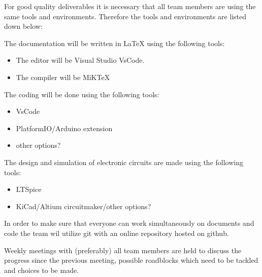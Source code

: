 For good quality deliverables it is necessary that all team members are using the same tools and environments. Therefore the tools and environments are listed down below:

The documentation will be written in LaTeX using the following tools:
\begin{itemize} 
    \setlength\itemsep{-0.3em}
    \item The editor will be Visual Studio VsCode.
    \item The compiler will be MiKTeX
\end{itemize}

The coding will be done using the following tools:
\begin{itemize}
    \item VsCode
    \item PlatformIO/Arduino extension
    \item other options?
\end{itemize}

The design and simulation of electronic circuits are made using the following tools:
\begin{itemize}
    \item LTSpice
    \item KiCad/Altium circuitmaker/other options?
\end{itemize}

In order to make sure that everyone can work simultaneously on documents and code the team wil utilize git with an online repository hosted on github.

Weekly meetings with (preferably) all team members are held to discuss the progress since the previous meeting, possible roadblocks which need to be tackled and choices to be made.